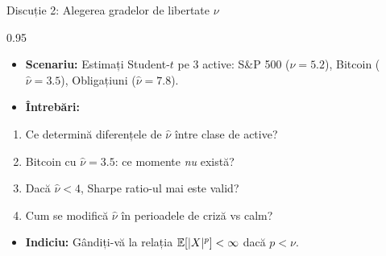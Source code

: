 \documentclass[9pt, aspectratio=169, t]{beamer}
\begin{document}
\begin{frame}{Discuție 2: Alegerea gradelor de libertate $\nu$}
\begin{cminipage}{0.95\textwidth}
    \begin{itemize}\setlength{\itemsep}{0pt}
        \item \textbf{Scenariu:} Estimați Student-$t$ pe 3 active: S\&P 500 ($\hat{\nu} = 5.2$), Bitcoin ($\hat{\nu} = 3.5$), Obligațiuni ($\hat{\nu} = 7.8$).
        \item \textbf{Întrebări:}
    \end{itemize}
    \begin{enumerate}\setlength{\itemsep}{0pt}
        \item Ce determină diferențele de $\hat{\nu}$ între clase de active?
        \item Bitcoin cu $\hat{\nu} = 3.5$: ce momente \textit{nu} există?
        \item Dacă $\hat{\nu} < 4$, Sharpe ratio-ul mai este valid?
        \item Cum se modifică $\hat{\nu}$ în perioadele de criză vs calm?
    \end{enumerate}

    \vspace{0.3cm}
    \begin{itemize}\setlength{\itemsep}{0pt}
        \item \textbf{Indiciu:} Gândiți-vă la relația $\mathbb{E}[|X|^p] < \infty$ dacă $p < \nu$.
    \end{itemize}
\end{cminipage}
\end{frame}
\end{document}
